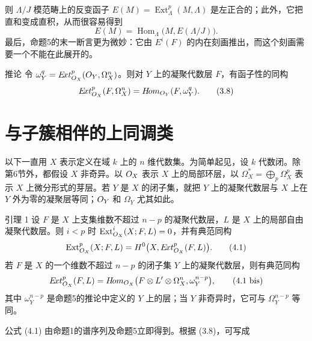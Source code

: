 则 $\Lambda/J$ 模范畴上的反变函子 $E(M)=\operatorname{Ext}_{\Lambda}^{p}(M,\Lambda)$ 是左正合的；此外，它把直和变成直积，从而很容易得到
\[
E(M)=\operatorname{Hom}_{\Lambda}\bigl(M,E(\Lambda/J)\bigr).
\]
最后，命题5的末一断言更为微妙：它由 $E^i(F)$ 的内在刻画推出，而这个刻画需要一个不能在此展开的。

\begin{statement}{推论}
令 $\omega_Y^q=E\!xt_{O_X}^{p}(O_Y,\Omega_X^n)$。则对 $Y$ 上的凝聚代数层 $F$，有函子性的同构
\begin{equation}
E\!xt_{O_X}^{p}(F,\Omega_X^n)=H\!om_{O_Y}(F,\omega_Y^q).
\tag{3.8}
\end{equation}
\end{statement}

\section{与子簇相伴的上同调类}
以下一直用 $X$ 表示定义在域 $k$ 上的 $n$ 维代数集。为简单起见，设 $k$ 代数闭。除第6节外，都假设 $X$ 非奇异。以 $O_X$ 表示 $X$ 上的局部环层，以 $\Omega_X^*=\bigoplus_p\Omega_X^p$ 表示 $X$ 上微分形式的芽层。若 $Y$ 是 $X$ 的闭子集，就把 $Y$ 上的凝聚代数层与 $X$ 上在 $Y$ 外为零的凝聚层等同；$O_Y$ 和 $\Omega_Y$ 尤其如此。
\begin{statement}{引理 1}
设 $F$ 是 $X$ 上支集维数不超过 $n-p$ 的凝聚代数层，$L$ 是 $X$ 上的局部自由凝聚代数层。则 $i<p$ 时 $\operatorname{Ext}_{O_X}^{i}(X;F,L)=0$，并有典范同构
\begin{equation}
\operatorname{Ext}_{O_X}^{p}(X;F,L)
=H^0\bigl(X,E\!xt_{O_X}^{p}(F,L)\bigr).
\tag{4.1}
\end{equation}
若 $F$ 是 $X$ 的一个维数不超过 $n-p$ 的闭子集 $Y$ 上的凝聚代数层，则有典范同构
\begin{equation}
E\!xt_{O_X}^{p}(F,L)=
H\!om_{O_X}\bigl(F\otimes L'\otimes\Omega_X^n,\omega_Y^{n-p}\bigr),
\tag{4.1 bis}
\end{equation}
其中 $\omega_Y^{n-p}$ 是命题5的推论中定义的 $Y$ 上的层；当 $Y$ 非奇异时，它可与 $\Omega_Y^{n-p}$ 等同。
\end{statement}
公式 (4.1) 由命题1的谱序列及命题5立即得到。根据 (3.8)，可写成


